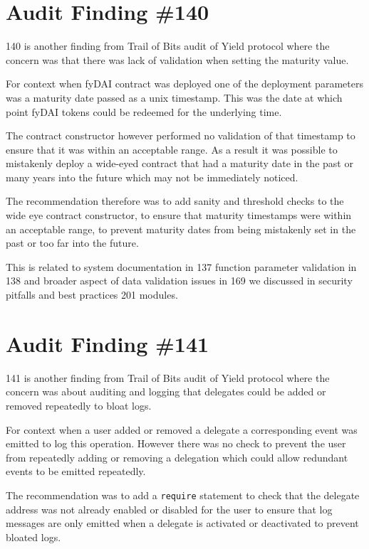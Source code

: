 \section{Audit Finding \#140}

140 is another finding from Trail of Bits audit of Yield protocol where the concern was that there was lack of validation when setting the maturity value. 

For context when fyDAI contract was deployed one of the deployment parameters was a maturity date passed as a unix timestamp. This was the date at which point fyDAI tokens could be redeemed for the underlying time.

The contract constructor however performed no validation of that timestamp to ensure that it was within an acceptable range. As a result it was possible to mistakenly deploy a wide-eyed contract that had a maturity date in the past or many years into the future which may not be immediately noticed.

The recommendation therefore was to add sanity and threshold checks to the wide eye contract constructor, to ensure that maturity timestamps were within an acceptable range, to prevent maturity dates from being mistakenly set in the past or too far into the future.

This is related to system documentation in 137 function parameter validation in 138 and broader aspect of data validation issues in 169 we discussed in security pitfalls and best practices 201 modules.

\section{Audit Finding \#141}

141 is another finding from Trail of Bits audit of Yield protocol where the concern was about auditing and logging that delegates could be added or removed repeatedly to bloat logs. 

For context when a user added or removed a delegate a corresponding event was emitted to log this operation. However there was no check to prevent the user from repeatedly adding or removing a delegation which could allow redundant events to be emitted repeatedly.

The recommendation was to add a \verb|require| statement to check that the delegate address was not already enabled or disabled for the user to ensure that log messages are only emitted when a delegate is activated or deactivated to prevent bloated logs.

